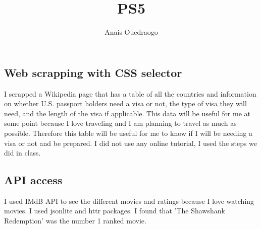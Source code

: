 \documentclass{article}
\title{PS5}
\author{Anais Ouedraogo}
\begin{document}
\maketitle




\subsection{Web scrapping with CSS selector}
I scrapped a Wikipedia page that has a table of all the countries and information on whether U.S. passport holders need a visa or not, the type of visa they will need, and the length of the visa if applicable. This data will be useful for me at some point because I love traveling and I am planning to travel as much as possible. Therefore this table will be useful for me to know if I will be needing a visa or not and be prepared. I did not use any online tutorial, I used the steps we did in class.

\subsection{API access}
 I used IMdB API to see the different movies and ratings because I love watching movies. I used jsonlite and httr packages. I found that 'The Shawshank Redemption' was the number 1 ranked movie.
\end{document}
